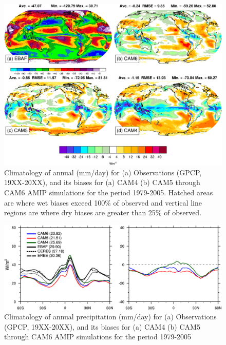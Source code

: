 \clearpage
\begin{figure}[t]
  \begin{center}
    \includegraphics[width=1.\textwidth,angle=0.]{./figs/f_SWCF_2D_CAM456_ANN.pdf}
  \end{center}
  \caption{Climatology of annual  (mm/day) for (a) Observations (GPCP, 19XX-20XX), and its biases for (a) CAM4 (b) CAM5  through CAM6 AMIP simulations for the period 1979-2005. Hatched areas are where wet biases exceed 100\% of observed and vertical line regions are where dry biases are greater than 25\% of observed.}
\label{f_SWCF_2D_CAM456}
\end{figure}




\clearpage
\begin{figure}[t]
    \includegraphics[width=1.\textwidth,angle=0.]{./figs/f_LWCF_1D_ANN_CAM456.pdf}
  \caption{Climatology of annual precipitation (mm/day) for (a) Observations (GPCP, 19XX-20XX), and its biases for (a) CAM4 (b) CAM5  through CAM6 AMIP simulations for the period 1979-2005} 
\label{f_LWCF_1D_ANN_CAM456}
\end{figure} 

